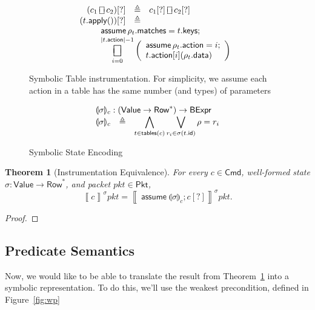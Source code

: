 \documentclass{article}
\newcommand{\pkt}{\mathit{pkt}}
\newcommand{\denote}[1]{\left\llbracket#1\right\rrbracket}
\newcommand{\Value}{\mathsf{Value}}
\newcommand{\BExpr}{\mathsf{BExpr}}
\newcommand{\Cmd}{\mathsf{Cmd}}
\newcommand{\Pkt}{\mathsf{Pkt}}
\newcommand{\Row}{\mathsf{Row}}
\newcommand{\matches}{\mathsf{matches}}
\newcommand{\action}{\mathsf{action}}
\newcommand{\keys}{\mathsf{keys}}
\newcommand{\data}{\mathsf{data}}
\newcommand{\id}{\mathsf{id}}
\newcommand{\assume}{\mathop{\mathsf{assume}}}
\newcommand{\apply}{\mathsf{apply}}
\newcommand{\choiceop}{\rotatebox[origin=c]{90}{$\sqsubset\!\!\!\sqsupset$}}
\newcommand{\choice}{\mathbin{\choiceop}}
\DeclareMathOperator*{\bigchoice}{\scalerel*{\choiceop}{\sum}}
\newcommand{\state}[1]{\llparenthesis#1\rrparenthesis}
\newcommand{\instr}{[?]}
\newcommand{\tables}{\mathop{\mathsf{tables}}}
\newtheorem{theorem}{Theorem}
\begin{document}
\begin{figure}[htp]
\[\begin{array}{r >{\triangleq}cl}
  (c_1 \choice c_2)\instr && c_1\instr \choice c_2\instr\\
  (t.\apply())\instr &&\\
  \multicolumn{3}{l}{
    \qquad
    \begin{array}[t]{l} \displaystyle
    \assume \rho_t.\matches = t.\keys; \\
    \displaystyle \bigchoice_{i=0}^{|t.\action| -1}
    \left(\begin{array}{l}
    \assume \rho_t.\action = i;\\
    t.\action[i](\rho_t.\data)
    \end{array}\right)\\
  \end{array}}
  \end{array}
  \]
  \caption{Symbolic Table instrumentation. For simplicity, we
    assume each action in a table has the same number (and types) of parameters}
  \label{fig:table-instrument}
\end{figure}

\begin{figure}[htp]
  \[\begin{array}{r cl}
  \multicolumn{3}{l}{\state\sigma_c : (\Value \to \Row^*) \to \BExpr} \\
  \state\sigma_c &\triangleq
  & \displaystyle\bigwedge_{ t \in \tables(c) }
  \bigvee_{r_i \in \sigma(t.\id)} \rho = r_i
  \end{array}
  \]
  \caption{Symbolic State Encoding}
  \label{fig:table-instrument}
\end{figure}

\begin{samepage}
\begin{theorem}[Instrumentation Equivalence]
  \label{thm:instr-equiv}
  For every $c \in \Cmd$, well-formed state $\sigma : \Value \to \Row^*$, and
  packet $\pkt \in \Pkt$, \[\denote{c}^\sigma\pkt = \denote{\assume
    \state\sigma_c; c\instr}^\sigma\pkt.\]
\end{theorem}
\begin{proof}
\end{proof}
\end{samepage}

\subsection{Predicate Semantics}

Now, we would like to be able to translate the result from
Theorem~\ref{thm:instr-equiv} into a
symbolic representation. To do this, we'll use the weakest precondition, defined
in Figure~\ref{fig:wp}
\end{document}

